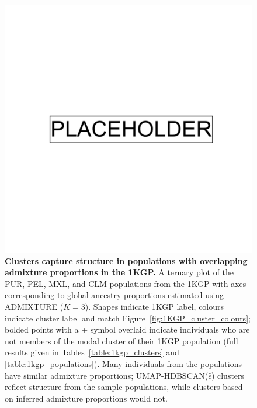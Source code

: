 \begin{figure}[ht]
  \centering
\includegraphics[width=0.75\linewidth]{placeholder.png}
  \caption[Clusters capture structure in populations with overlapping admixture proportions in the 1KGP]{\textbf{Clusters capture structure in populations with overlapping admixture proportions in the 1KGP.} A ternary plot of the PUR, PEL, MXL, and CLM populations from the 1KGP with axes corresponding to global ancestry proportions estimated using ADMIXTURE ($K=3$). Shapes indicate 1KGP label, colours indicate cluster label and match Figure~\ref{fig:1KGP_cluster_colours}; bolded points with a + symbol overlaid indicate individuals who are not members of the modal cluster of their 1KGP population (full results given in Tables~\ref{table:1kgp_clusters} and \ref{table:1kgp_populations}). Many individuals from the populations have similar admixture proportions; UMAP-HDBSCAN($\hat{\epsilon}$) clusters reflect structure from the sample populations, while clusters based on inferred admixture proportions would not.}
  \label{fig:1000GP_ternary}
\end{figure}

\clearpage

